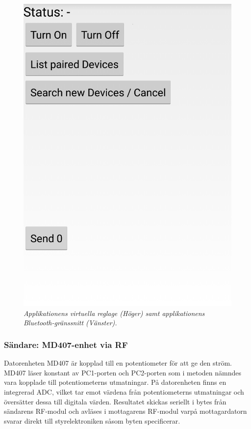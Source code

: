 \documentclass[a4paper]{article}
\begin{document}
\begin{figure}[H]
\includegraphics[scale=0.2]{applikation2.png}
\centering
\caption{\it Applikationens virtuella reglage (Höger) samt applikationens Bluetooth-gränssnitt (Vänster).}
\end{figure} 

\subsubsection{Sändare: MD407-enhet via RF}
Datorenheten MD407 är kopplad till en potentiometer för att ge den ström. MD407 läser konstant av PC1-porten och PC2-porten som i metoden nämndes vara kopplade till potentiometerns utmatningar. På datorenheten finns en integrerad ADC, vilket tar emot värdena från potentiometerns utmatningar och översätter dessa till digitala värden. Resultatet skickas seriellt i bytes från sändarens RF-modul och avläses i mottagarens RF-modul varpå mottagardatorn svarar direkt till styrelektroniken såsom byten specificerar.
\end{document}

